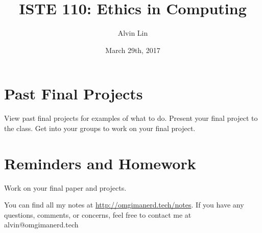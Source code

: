\documentclass[letterpaper, 12pt]{article}
\title{ISTE 110: Ethics in Computing}
\author{Alvin Lin}
\date{March 29th, 2017}
\begin{document}
\maketitle

\section*{Past Final Projects}
View past final projects for examples of what to do.
Present your final project to the class.
Get into your groups to work on your final project.

\section*{Reminders and Homework}
Work on your final paper and projects.

\begin{center}
  You can find all my notes at \url{http://omgimanerd.tech/notes}. If you have
  any questions, comments, or concerns, feel free to contact me at
  alvin@omgimanerd.tech
\end{center}
\end{document}
